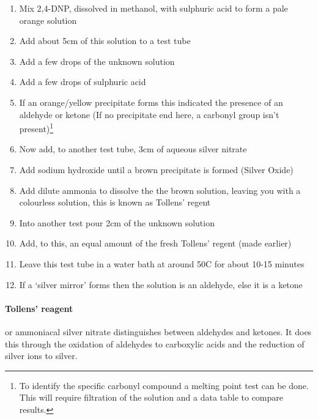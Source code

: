 	\begin{enumerate}
		\item Mix 2,4-DNP, dissolved in methanol, with sulphuric acid to form a pale orange solution
		
		\item Add about 5cm of this solution to a test tube
		
		\item Add a few drops of the unknown solution
		
		\item Add a few drops of sulphuric acid
		
		\item If an orange/yellow precipitate forms this indicated the presence of an aldehyde or ketone (If no precipitate end here, a carbonyl group isn't present)\footnote{To identify the specific carbonyl compound a melting point test can be done. This will require filtration of the solution and a data table to compare results.}
		
		\item Now add, to another test tube, 3cm of aqueous silver nitrate
		
		\item Add sodium hydroxide until a brown precipitate is formed (Silver Oxide)
		
		\item Add dilute ammonia to dissolve the the brown solution, leaving you with a colourless solution, this is known as Tollens' regent
	
		\item Into another test pour 2cm of the unknown solution
		
		\item Add, to this, an equal amount of the fresh Tollens' regent (made earlier)
		
		\item Leave this test tube in a water bath at around 50\degree C for about 10-15 minutes
		
		\item If a `silver mirror' forms then the solution is an aldehyde, else it is a ketone
	\end{enumerate}
	
	\paragraph{Tollens' reagent} or ammoniacal silver nitrate distinguishes between aldehydes and ketones. It does this through the oxidation of aldehydes to carboxylic acids and the reduction of silver ions to silver.
	
